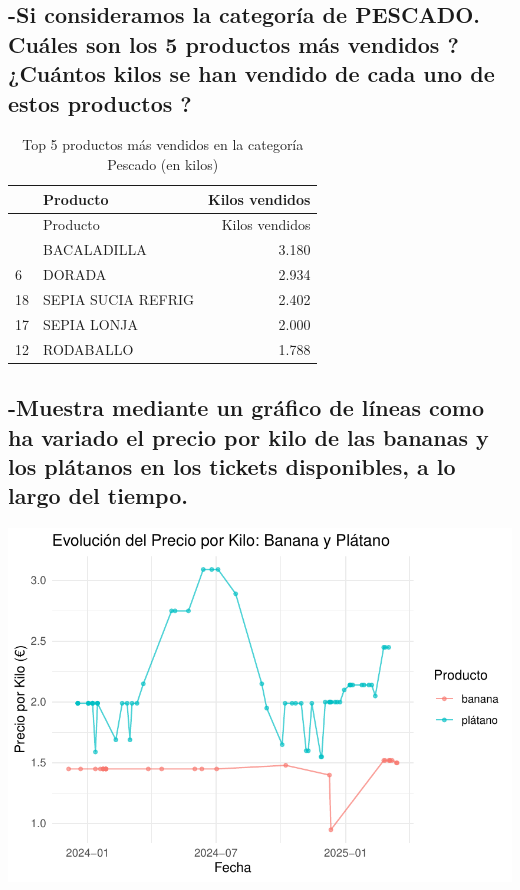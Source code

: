 \documentclass[,article,submit,moreauthors,pdftex]{Definitions/mdpi}
\begin{document}
\hypertarget{si-consideramos-la-categoruxeda-de-pescado.-cuuxe1les-son-los-5-productos-muxe1s-vendidos-cuuxe1ntos-kilos-se-han-vendido-de-cada-uno-de-estos-productos}{%
\subsection{-Si consideramos la categoría de PESCADO. Cuáles son los 5
productos más vendidos ? ¿Cuántos kilos se han vendido de cada uno de
estos productos
?}\label{si-consideramos-la-categoruxeda-de-pescado.-cuuxe1les-son-los-5-productos-muxe1s-vendidos-cuuxe1ntos-kilos-se-han-vendido-de-cada-uno-de-estos-productos}}

\begin{longtable}[]{@{}llr@{}}
\caption{Top 5 productos más vendidos en la categoría Pescado (en
kilos)}\tabularnewline
\toprule\noalign{}
& Producto & Kilos vendidos \\
\midrule\noalign{}
\endfirsthead
\toprule\noalign{}
& Producto & Kilos vendidos \\
\midrule\noalign{}
\endhead
\bottomrule\noalign{}
\endlastfoot
1 & BACALADILLA & 3.180 \\
6 & DORADA & 2.934 \\
18 & SEPIA SUCIA REFRIG & 2.402 \\
17 & SEPIA LONJA & 2.000 \\
12 & RODABALLO & 1.788 \\
\end{longtable}

\hypertarget{muestra-mediante-un-gruxe1fico-de-luxedneas-como-ha-variado-el-precio-por-kilo-de-las-bananas-y-los-pluxe1tanos-en-los-tickets-disponibles-a-lo-largo-del-tiempo.}{%
\subsection{-Muestra mediante un gráfico de líneas como ha variado el
precio por kilo de las bananas y los plátanos en los tickets
disponibles, a lo largo del
tiempo.}\label{muestra-mediante-un-gruxe1fico-de-luxedneas-como-ha-variado-el-precio-por-kilo-de-las-bananas-y-los-pluxe1tanos-en-los-tickets-disponibles-a-lo-largo-del-tiempo.}}

\includegraphics[width=0.9\linewidth]{ProyectoTD2025_files/figure-latex/unnamed-chunk-21-1}
\end{document}
